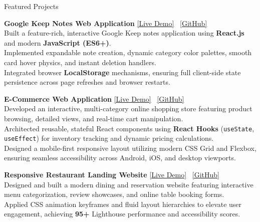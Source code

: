 \documentclass{resume} %
\begin{document}
\begin{rSection}{Featured Projects}

\item \textbf{Google Keep Notes Web Application} \hfill {\href{https://nikitajha-2511.github.io/notes/}{[Live Demo]}} \ {\href{https://github.com/nikitajha-2511/to-do-list}{[GitHub]}}
\\ Built a feature-rich, interactive Google Keep notes application using \textbf{React.js} and modern \textbf{JavaScript (ES6+)}.
\\ Implemented expandable note creation, dynamic category color palettes, smooth card hover physics, and instant deletion handlers.
\\ Integrated browser \textbf{LocalStorage} mechanisms, ensuring full client-side state persistence across page refreshes and browser restarts.

\smallskip

\item \textbf{E-Commerce Web Application} \hfill {\href{https://nikitajha-2511.github.io/\#projects}{[Live Demo]}} \ {\href{https://github.com/nikitajha-2511}{[GitHub]}}
\\ Developed an interactive, multi-category online shopping store featuring product browsing, detailed views, and real-time cart manipulation.
\\ Architected reusable, stateful React components using \textbf{React Hooks} (\texttt{useState}, \texttt{useEffect}) for inventory tracking and dynamic pricing calculations.
\\ Designed a mobile-first responsive layout utilizing modern CSS Grid and Flexbox, ensuring seamless accessibility across Android, iOS, and desktop viewports.

\smallskip

\item \textbf{Responsive Restaurant Landing Website} \hfill {\href{https://nikitajha-2511.github.io/\#projects}{[Live Demo]}} \ {\href{https://github.com/nikitajha-2511/foodie-restaurant-frontend}{[GitHub]}}
\\ Designed and built a modern dining and reservation website featuring interactive menu categorization, review showcases, and online table booking forms.
\\ Applied CSS animation keyframes and fluid layout hierarchies to elevate user engagement, achieving \textbf{95+} Lighthouse performance and accessibility scores.

\end{rSection}
\end{document}
